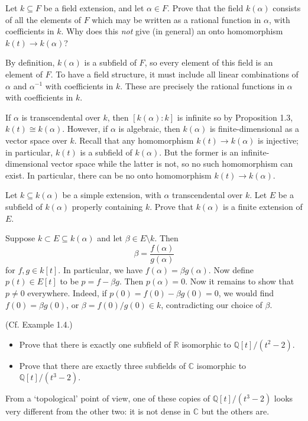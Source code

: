\documentclass[../../master.tex]{subfiles}
\begin{document}
\begin{problem}
    Let $k \subseteq F$ be a field extension, and let $\alpha \in F$.
    Prove that the field $k(\alpha)$ consists of all the elements of $F$ which may be written as a rational function in $\alpha$, with coefficients in $k$.
    Why does this \textit{not} give (in general) an onto homomorphism $k(t) \to k(\alpha)$?
\end{problem}

\begin{solution}
    By definition, $k(\alpha)$ is a subfield of $F$, so every element of this field is an element of $F$.
    To have a field structure, it must include all linear combinations of $\alpha$ and $\alpha^{-1}$ with coefficients in $k$.
    These are precisely the rational functions in $\alpha$ with coefficients in $k$.

    If $\alpha$ is transcendental over $k$, then $[k(\alpha):k]$ is infinite so by Proposition 1.3, $k(t) \cong k(\alpha)$.
    However, if $\alpha$ is algebraic, then $k(\alpha)$ is finite-dimensional as a vector space over $k$.
    Recall that any homomorphism $k(t) \to k(\alpha)$ is injective;
    in particular, $k(t)$ is a subfield of $k(\alpha)$.
    But the former is an infinite-dimensional vector space while the latter is not, so no such homomorphism can exist.
    In particular, there can be no onto homomorphism $k(t) \to k(\alpha)$.
\end{solution}

\begin{problem}
    Let $k \subseteq k(\alpha)$ be a simple extension, with $\alpha$ transcendental over $k$.
    Let $E$ be a subfield of $k(\alpha)$ properly containing $k$.
    Prove that $k(\alpha)$ is a finite extension of $E$.
\end{problem}

\begin{solution}
    Suppose $k \subset E \subseteq k(\alpha)$ and let $\beta \in E \setminus k$.
    Then
    \[
        \beta = \frac{f(\alpha)}{g(\alpha)}
    \]
    for $f, g \in k[t]$.
    In particular, we have $f(\alpha) = \beta g(\alpha)$.
    Now define $p(t) \in E[t]$ to be $p = f - \beta g$.
    Then $p(\alpha) = 0$.
    Now it remains to show that $p \neq 0$ everywhere.
    Indeed, if $p(0) = f(0) - \beta g(0) = 0$, we would find $f(0) = \beta g(0)$, or $\beta = f(0) / g(0) \in k$, contradicting our choice of $\beta$.
\end{solution}

\begin{problem}
    (Cf. Example 1.4.)
    \begin{itemize}
        \item Prove that there is exactly one subfield of $\mathbb{R}$ isomorphic to $\mathbb{Q}[t] / (t^2 - 2)$.
        \item Prove that there are exactly three subfields of $\mathbb{C}$ isomorphic to $\mathbb{Q}[t] / (t^3 - 2)$.
    \end{itemize}
    From a `topological' point of view, one of these copies of $\mathbb{Q}[t] / (t^3 - 2)$ looks very different from the other two: it is not dense in $\mathbb{C}$ but the others are.
\end{problem}
\end{document}

